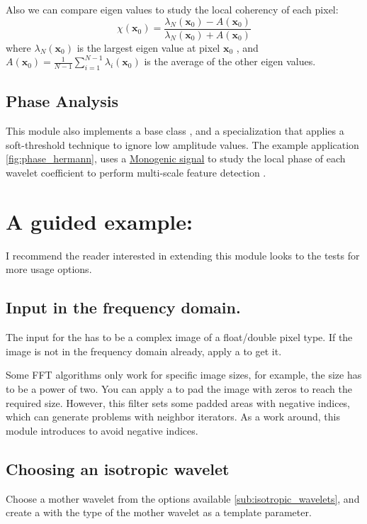  Also we can compare eigen values to study the local coherency of each pixel:
 $$
 \chi (\mathbf{x}_0)= \frac{\lambda_N(\mathbf{x}_0) - A(\mathbf{x}_0)}{\lambda_N(\mathbf{x}_0) + A(\mathbf{x}_0)}
 $$
where $\lambda_N(\mathbf{x}_0)$ is the largest eigen value at pixel $\mathbf{x}_0$ ,
and
$A(\mathbf{x}_0) = \frac{1}{N-1}\sum_{i=1}^{N-1}\lambda_i(\mathbf{x}_0)$ is the average of the other eigen values.

\subsection{Phase Analysis}
\label{sub:phase_analyzers}

This module also implements a base class , and a specialization  that applies a soft-threshold technique to ignore low amplitude values. The example application \ref{fig:phase_hermann}, uses a \hyperref[sub:monogenic]{Monogenic signal} to study the local phase of each wavelet coefficient to perform multi-scale feature detection \cite{felsberg_monogenic_2001,unser_multiresolution_2009}.

\section{A guided example:}
I recommend the reader interested in extending this module looks to the tests for more usage options.
\subsection{Input in the frequency domain.}
The input for the  has to be a complex image of a float/double pixel type. If the image is not in the frequency domain already, apply a  to get it.

Some FFT algorithms only work for specific image sizes, for example, the size has to be a power of two.
You can apply a  to pad the image with zeros to reach the required size. However, this filter sets some padded areas with negative indices, which can generate problems with neighbor iterators.
As a work around, this module introduces  to avoid negative indices.

\subsection{Choosing an isotropic wavelet}
\label{sub:Choosing}
Choose a mother wavelet from the options available \ref{sub:isotropic_wavelets}, and create a
 with the type of the mother wavelet as a template parameter.

